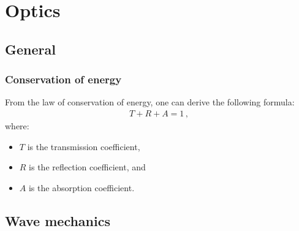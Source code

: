 \chapter{Optics}

    \minitoc

\section{General}
\subsection{Conservation of energy}

    From the law of conservation of energy, one can derive the following formula:
    \begin{gather}
        \label{optics:energy_conservation}
        T+R+A=1\,,
    \end{gather}
    where:
    \begin{itemize}
        \item $T$ is the transmission coefficient,
        \item $R$ is the reflection coefficient, and
        \item $A$ is the absorption coefficient.
    \end{itemize}

\section{Wave mechanics}

